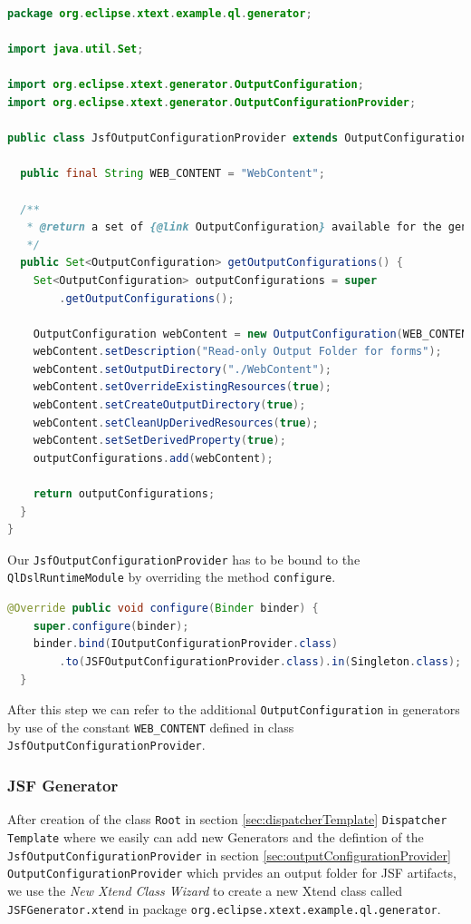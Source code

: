 \begin{lstlisting}[language=Java]
package org.eclipse.xtext.example.ql.generator;

import java.util.Set;

import org.eclipse.xtext.generator.OutputConfiguration;
import org.eclipse.xtext.generator.OutputConfigurationProvider;

public class JsfOutputConfigurationProvider extends OutputConfigurationProvider {

  public final String WEB_CONTENT = "WebContent";

  /**
   * @return a set of {@link OutputConfiguration} available for the generator
   */
  public Set<OutputConfiguration> getOutputConfigurations() {
    Set<OutputConfiguration> outputConfigurations = super
        .getOutputConfigurations();

    OutputConfiguration webContent = new OutputConfiguration(WEB_CONTENT);
    webContent.setDescription("Read-only Output Folder for forms");
    webContent.setOutputDirectory("./WebContent");
    webContent.setOverrideExistingResources(true);
    webContent.setCreateOutputDirectory(true);
    webContent.setCleanUpDerivedResources(true);
    webContent.setSetDerivedProperty(true);
    outputConfigurations.add(webContent);

    return outputConfigurations;
  }
}
\end{lstlisting}

Our \texttt{JsfOutputConfigurationProvider} has to be bound to the
\texttt{QlDslRuntimeModule} by overriding the method \texttt{configure}. 

\begin{lstlisting}[language=Java]
@Override public void configure(Binder binder) {
    super.configure(binder);
    binder.bind(IOutputConfigurationProvider.class)
        .to(JSFOutputConfigurationProvider.class).in(Singleton.class);
  }
 \end{lstlisting}
 
After
this step we can refer to the additional \texttt{OutputConfiguration} in
generators by use of the constant \texttt{WEB\_CONTENT} defined in class
\texttt{JsfOutputConfigurationProvider}.

\subsubsection {JSF Generator}
\label{sec:jsfGenerator}

After creation of the class \texttt{Root} in section
\ref{sec:dispatcherTemplate} \texttt{Dispatcher Template} where we easily can
add new Generators and the defintion of the
\texttt{JsfOutputConfigurationProvider} in section \ref{sec:outputConfigurationProvider}
\texttt{OutputConfigurationProvider} which prvides an output folder for JSF
artifacts, we use the \emph{New Xtend Class Wizard} to create a new Xtend class
called \texttt{JSFGenerator.xtend} in package \texttt{org.eclipse.xtext.example.ql.generator}.

